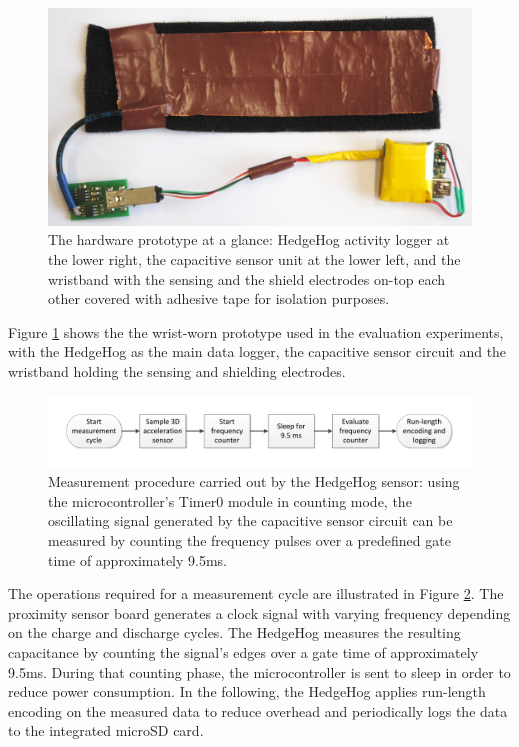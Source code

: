 \documentclass[runningheads,a4paper]{llncs}
\begin{document}
\begin{figure}
	\centering
		\includegraphics[width=1.00\textwidth]{Images/capacitive_sensor_wristband_2.jpg}
	\caption{The hardware prototype at a glance: HedgeHog activity logger at the lower right, the capacitive sensor unit at the lower left, and the wristband with the sensing and the shield electrodes on-top each other covered with adhesive tape for isolation purposes.}
	\label{fig:cap_sensor}
\end{figure}

Figure \ref{fig:cap_sensor} shows the the wrist-worn prototype used in the evaluation experiments, with the HedgeHog as the main data logger, the capacitive sensor circuit and the wristband holding the sensing and shielding electrodes.

\begin{figure}[t]
	\centering
 		\includegraphics[trim=1cm 1cm 1cm 1cm,clip,width=\textwidth]{Images/pseudocode.pdf}
	\caption{Measurement procedure carried out by the HedgeHog sensor: using the microcontroller's Timer0 module in counting mode, the oscillating signal generated by the capacitive sensor circuit can be measured by counting the frequency pulses over a predefined gate time of approximately 9.5ms.}
	\label{fig:pseudocode}
\end{figure}

The operations required for a measurement cycle are illustrated in Figure \ref{fig:pseudocode}. The proximity sensor board generates a clock signal with varying frequency depending on the charge and discharge cycles. The HedgeHog measures the resulting capacitance by counting the signal's edges over a gate time of approximately 9.5ms. During that counting phase, the microcontroller is sent to sleep in order to reduce power consumption. In the following, the HedgeHog applies run-length encoding on the measured data to reduce overhead and periodically logs the data to the integrated microSD card.
\end{document}
